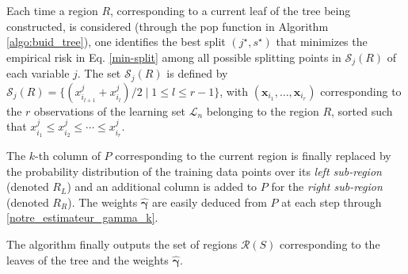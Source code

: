 Each time a region $R$, corresponding to a current leaf of the tree being constructed, is considered (through the pop function in Algorithm \ref{algo:buid_tree}), one identifies the best split $(j^\star, s^\star)$ that minimizes the empirical risk in Eq. \eqref{min-split} among all possible splitting points in $\mathcal{S}_j(R)$ of each variable $j$. The set $\mathcal{S}_j(R)$ is defined by $\mathcal{S}_j(R) = \{ (x_{i_{l+1}}^j+x_{i_{l}}^j)/2 \mid  {1\leq l \leq r-1}\}$, with $(\boldsymbol{x}_{i_1}, \ldots, \boldsymbol{x}_{i_r})$ corresponding to the $r$ observations of the learning set $\mathcal{L}_n$ belonging to the region $R$, sorted such that $x_{i_1}^j \leq x_{i_2}^j \leq \cdots \leq x_{i_r}^j$.

The $k$-th column of $P$ corresponding to the current region is finally replaced by the probability distribution of the training data points over its \textit{left sub-region} (denoted $R_L$) and an additional column is added to $P$ for the \textit{right sub-region} (denoted $R_R$). The weights $\hat{\boldsymbol{\gamma}}$ are easily deduced from $P$ at each step through \eqref{notre_estimateur_gamma_k}.

The algorithm finally outputs the set of regions $\mathcal{R}(S)$ corresponding to the leaves of the tree and the weights $\hat{\boldsymbol{\gamma}}$.


